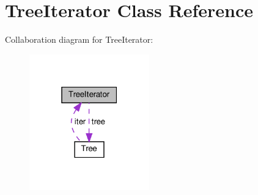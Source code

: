 \hypertarget{classTreeIterator}{}\section{Tree\+Iterator Class Reference}
\label{classTreeIterator}


Collaboration diagram for Tree\+Iterator\+:
\nopagebreak
\begin{figure}[H]
\begin{center}
\leavevmode
\includegraphics[width=147pt]{classTreeIterator__coll__graph}
\end{center}
\end{figure}
